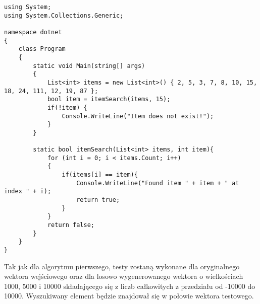 \begin{lstlisting}[language=CSharp, caption={Odwzorowany kod JavaScript w języku C\# algorytmu przeszukiwania.}, label=alg:alg1]
using System;
using System.Collections.Generic;

namespace dotnet
{
    class Program
    {
        static void Main(string[] args)
        {
            List<int> items = new List<int>() { 2, 5, 3, 7, 8, 10, 15, 18, 24, 111, 12, 19, 87 };
            bool item = itemSearch(items, 15);
            if(!item) {
                Console.WriteLine("Item does not exist!");
            }
        }

        static bool itemSearch(List<int> items, int item){
            for (int i = 0; i < items.Count; i++)
            {
                if(items[i] == item){
                    Console.WriteLine("Found item " + item + " at index " + i);
                    return true;
                }
            }
            return false;
        }
    }
}
\end{lstlisting}

\par Tak jak dla algorytmu pierwszego, testy zostaną wykonane dla oryginalnego wektora wejściowego oraz dla losowo wygenerowanego wektora o wielkościach 1000, 5000 i 10000 składającego się z liczb całkowitych z przedziału od -10000 do 10000. Wyszukiwany element będzie znajdował się w połowie wektora testowego.
\par 
